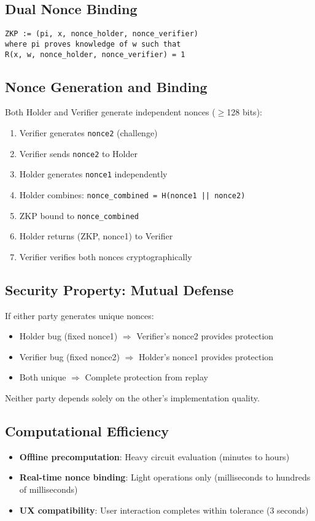 \subsection{Dual Nonce Binding}

\begin{verbatim}
ZKP := (pi, x, nonce_holder, nonce_verifier)
where pi proves knowledge of w such that
R(x, w, nonce_holder, nonce_verifier) = 1
\end{verbatim}

\subsection{Nonce Generation and Binding}

Both Holder and Verifier generate independent nonces ($\geq$128 bits):

\begin{enumerate}
  \item Verifier generates \texttt{nonce2} (challenge)
  \item Verifier sends \texttt{nonce2} to Holder
  \item Holder generates \texttt{nonce1} independently
  \item Holder combines: \texttt{nonce\_combined = H(nonce1 || nonce2)}
  \item ZKP bound to \texttt{nonce\_combined}
  \item Holder returns (ZKP, nonce1) to Verifier
  \item Verifier verifies both nonces cryptographically
\end{enumerate}

\subsection{Security Property: Mutual Defense}

If either party generates unique nonces:
\begin{itemize}
  \item Holder bug (fixed nonce1) $\Rightarrow$ Verifier's nonce2 provides protection
  \item Verifier bug (fixed nonce2) $\Rightarrow$ Holder's nonce1 provides protection
  \item Both unique $\Rightarrow$ Complete protection from replay
\end{itemize}

Neither party depends solely on the other's implementation quality.

\subsection{Computational Efficiency}

\begin{itemize}
  \item \textbf{Offline precomputation}: Heavy circuit evaluation (minutes to hours)
  \item \textbf{Real-time nonce binding}: Light operations only (milliseconds to hundreds of milliseconds)
  \item \textbf{UX compatibility}: User interaction completes within tolerance (3 seconds)
\end{itemize}

